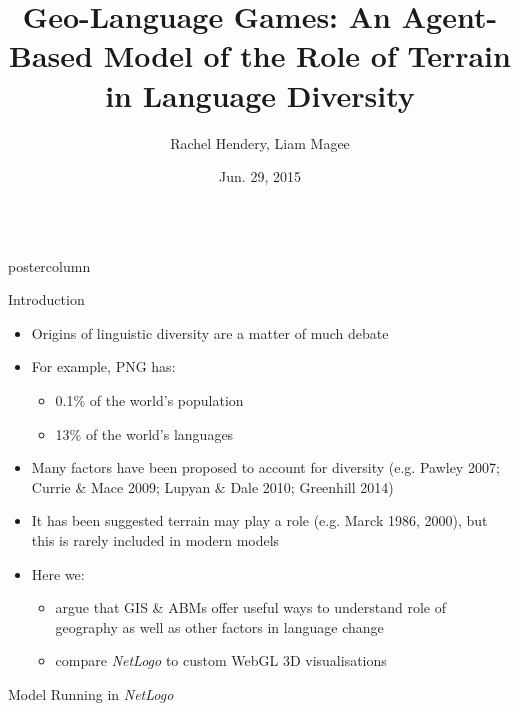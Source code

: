 \documentclass[final,hyperref={pdfpagelabels=false}]{beamer}
\title{\huge Geo-Language Games: An Agent-Based Model of the Role of Terrain in Language Diversity}
\author{Rachel Hendery, Liam Magee}
\institute[University of Western Sydney]{Digital Humanities Research Group, University of Western Sydney, Parramatta, Australia}
\date[Jun. 29, 2015]{Jun. 29, 2015}
\newlength{\columnheight}
\begin{document}
\begin{frame}
  \begin{columns}
    \begin{column}{.33\textwidth}
      \begin{beamercolorbox}[center,wd=\textwidth]{postercolumn}
        \begin{minipage}[T]{.95\textwidth}  %
          \parbox[t][\columnheight]{\textwidth}{ %
            \begin{block}{Introduction}
              \begin{itemize}
              \item Origins of linguistic diversity are a matter of much debate
              \item For example, PNG has:
                \begin{itemize}
                \item 0.1\% of the world's population
                \item 13\% of the world's languages
                \end{itemize}
              \item Many factors have been proposed to account for diversity (e.g. Pawley 2007; Currie \& Mace 2009; Lupyan \& Dale 2010; Greenhill 2014)
              \item It has been suggested terrain may play a role (e.g. Marck 1986, 2000), but this is rarely included in modern models
              \item Here we:
              \begin{itemize}
            \item argue that GIS \& ABMs offer useful ways to understand role of geography as well as other factors in language change
              \item compare \textit{NetLogo} to custom WebGL 3D visualisations \end{itemize}
              \end{itemize}
            \end{block}
            \vfill
            \begin{block}{Model Running in \textit{NetLogo}}

\end{block}}
\end{minipage}
\end{beamercolorbox}
\end{column}
\end{columns}
\end{frame}
\end{document}
